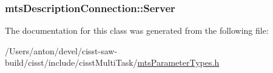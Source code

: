 \subsubsection[{Server}]{ mts\+Description\+Connection\+::\+Server}\label{classmts_description_connection_a7b9d1dbdb53304b7e999fbf7877179b7}


The documentation for this class was generated from the following file\+:\begin{DoxyCompactItemize}
\item 
/\+Users/anton/devel/cisst-\/saw-\/build/cisst/include/cisst\+Multi\+Task/\hyperlink{mts_parameter_types_8h}{mts\+Parameter\+Types.\+h}\end{DoxyCompactItemize}

